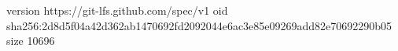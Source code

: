 version https://git-lfs.github.com/spec/v1
oid sha256:2d8d5f04a42d362ab1470692fd2092044e6ac3e85e09269add82e70692290b05
size 10696
